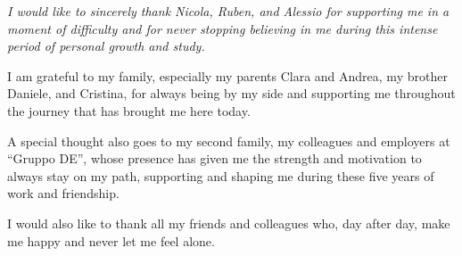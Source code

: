 \cleardoublepage
\begin{flushright}
\itshape I would like to sincerely thank Nicola, Ruben, and Alessio for supporting me in a moment of difficulty and for never stopping believing in me during this intense period of personal growth and study. \\ \vspace{5mm}

I am grateful to my family, especially my parents Clara and Andrea, my brother Daniele, and Cristina, for always being by my side and supporting me throughout the journey that has brought me here today. \\ \vspace{5mm}

A special thought also goes to my second family, my colleagues and employers at ``Gruppo DE'', whose presence has given me the strength and motivation to always stay on my path, supporting and shaping me during these five years of work and friendship. \\ \vspace{5mm}

I would also like to thank all my friends and colleagues who, day after day, make me happy and never let me feel alone.
\end{flushright}
\cleardoublepage